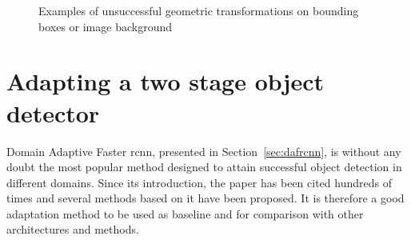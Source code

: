 \documentclass[%
    corpo=12pt,
    twoside,
    stile=classica,   
    tipotesi=magistrale,
    evenboxes,
    english,
	numerazioneromana,
]{toptesi}
\begin{document}
\begin{figure}[ht]
	\centering
	\caption{Examples of unsuccessful geometric transformations on bounding boxes or image background}
	\label{fig:badaugs}
\end{figure}

\section{Adapting a two stage object detector}
Domain Adaptive Faster \acrshort{rcnn}\cite{chen2018domain}, presented in Section~\ref{sec:dafrcnn}, is without any doubt the most popular method designed to attain successful object detection in different domains. Since its introduction, the paper has been cited hundreds of times and several methods based on it have been proposed. It is therefore a good adaptation method to be used as baseline and for comparison with other architectures and methods.
\end{document}

